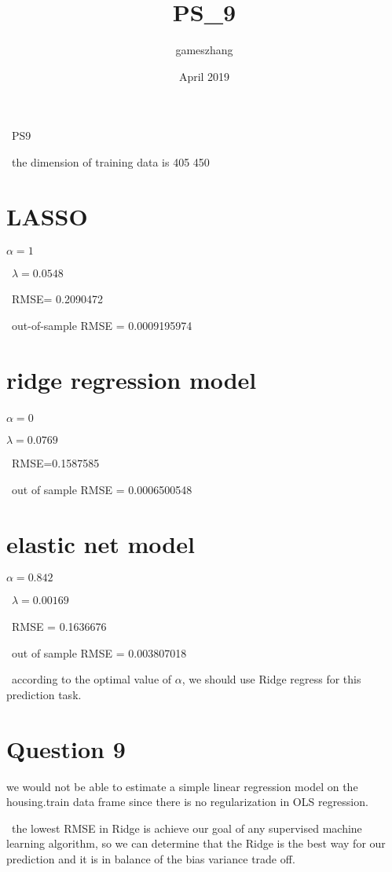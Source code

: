 \documentclass{article}
\title{PS_9}
\author{gameszhang }
\date{April 2019}
\begin{document}
\
PS9 


\
the dimension of training data is 405 450
\section{LASSO}
$\alpha=1$

\
$\lambda=0.0548$ 

\
RMSE= 0.2090472

\
out-of-sample RMSE = 0.0009195974

\section{ridge regression model}
$\alpha=0$
\

$\lambda=0.0769$

\
RMSE=0.1587585

\
out of sample RMSE = 0.0006500548

\section{elastic net model}
$\alpha=0.842$

\
$\lambda = 0.00169$

\
RMSE = 0.1636676

\
out of sample RMSE = 0.003807018

\
according to the optimal value of $\alpha$, we should use Ridge regress for this prediction task.

\section{Question 9}
we would not be able to estimate a simple linear regression model on the
housing.train data frame since there is no regularization in OLS regression.

\
the lowest RMSE in Ridge is achieve our goal of any supervised machine learning algorithm, so we can determine that the Ridge is the best way for our prediction and it is in balance of the bias variance trade off.
\end{document}
